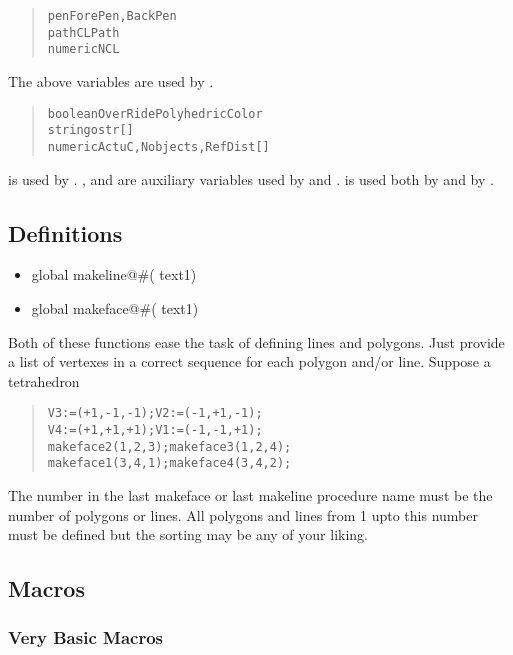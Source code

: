 \begin{quote}
\begin{alltt}
pen ForePen, BackPen
path CLPath
numeric NCL
\end{alltt}
\end{quote}
The above variables are used by .

\begin{quote}
\begin{alltt}
boolean OverRidePolyhedricColor
string ostr[]
numeric ActuC, Nobjects, RefDist[]
\end{alltt}
\end{quote}
 is used by .
,  and  are auxiliary
variables used by  and .
 is used both by  and
by .

\subsection{Definitions}

\begin{itemize}
\item global makeline@\#( text1)
\item global makeface@\#( text1)
\end{itemize}
Both of these functions ease the task of
defining lines and polygons. Just
provide a list of vertexes in a correct
sequence for each polygon and/or
line. Suppose a tetrahedron
\begin{quote}
\begin{alltt}
V3:=(+1,-1,-1);V2:=(-1,+1,-1);
V4:=(+1,+1,+1);V1:=(-1,-1,+1);
makeface2(1,2,3);makeface3(1,2,4);
makeface1(3,4,1);makeface4(3,4,2);
\end{alltt}
\end{quote}
The
number in the last makeface or last
makeline procedure name must be the
number of polygons or lines. All polygons and lines from 1 upto this
number must be defined but the sorting may be any of your liking.

\subsection{Macros}

\subsubsection{Very Basic Macros}


